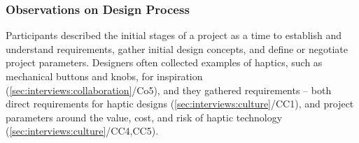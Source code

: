 \subsubsection{Observations on Design Process}
\noindent
Participants described the initial stages of a project as a time to establish and understand requirements, gather initial design concepts, and define or negotiate project parameters.
Designers often collected examples of haptics, such as mechanical buttons and knobs, for inspiration (\ref{sec:interviews:collaboration}/Co5), 
and  they gathered requirements -- both direct requirements for haptic designs (\ref{sec:interviews:culture}/CC1), and project parameters around the value, cost, and risk of haptic technology (\ref{sec:interviews:culture}/CC4,CC5).






